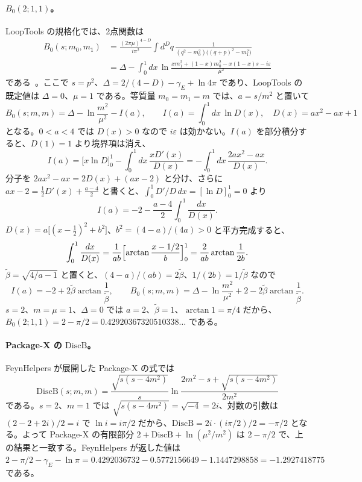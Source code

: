 \documentclass[a4paper,10pt]{ltjsarticle}
\begin{document}
\paragraph{$B_0(2;1,1)$。}LoopTools の規格化では、2点関数は
\begin{equation}
\begin{split}
B_0(s;m_0,m_1)&=\frac{(2\pi\mu)^{4-D}}{i\pi^2}\int d^Dq\,\frac{1}{(q^2-m_0^2)\bigl((q+p)^2-m_1^2\bigr)}\\
&=\Delta-\int_0^1 dx\,\ln\frac{x m_1^2+(1-x)m_0^2-x(1-x)s-i\varepsilon}{\mu^2}
\end{split}
\end{equation}
である~\cite{fcalc}。ここで $s=p^2$、$\Delta=2/(4-D)-\gamma_E+\ln4\pi$ であり、LoopTools の既定値は $\Delta=0$、$\mu=1$ である。等質量 $m_0=m_1=m$ では、$a=s/m^2$ と置いて
\begin{equation}
B_0(s;m,m)=\Delta-\ln\frac{m^2}{\mu^2}-I(a),\qquad I(a)=\int_0^1dx\,\ln D(x),\quad D(x)=ax^2-ax+1
\end{equation}
となる。$0<a<4$ では $D(x)>0$ なので $i\varepsilon$ は効かない。$I(a)$ を部分積分すると、$D(1)=1$ より境界項は消え、
\begin{equation}
I(a)=\bigl[x\ln D\bigr]_0^1-\int_0^1dx\,\frac{xD'(x)}{D(x)}=-\int_0^1dx\,\frac{2ax^2-ax}{D(x)}.
\end{equation}
分子を $2ax^2-ax=2D(x)+(ax-2)$ と分け、さらに $ax-2=\tfrac12D'(x)+\tfrac{a-4}{2}$ と書くと、$\int_0^1D'/D\,dx=[\ln D]_0^1=0$ より
\begin{equation}
I(a)=-2-\frac{a-4}{2}\int_0^1\frac{dx}{D(x)}.
\end{equation}
$D(x)=a\bigl[(x-\tfrac12)^2+b^2\bigr]$、$b^2=(4-a)/(4a)>0$ と平方完成すると、
\begin{equation}
\int_0^1\frac{dx}{D(x)}=\frac{1}{ab}\Bigl[\arctan\frac{x-1/2}{b}\Bigr]_0^1=\frac{2}{ab}\arctan\frac{1}{2b}.
\end{equation}
$\tilde\beta=\sqrt{4/a-1}$ と置くと、$(4-a)/(ab)=2\tilde\beta$、$1/(2b)=1/\tilde\beta$ なので
\begin{equation}
I(a)=-2+2\tilde\beta\arctan\frac{1}{\tilde\beta},\qquad
B_0(s;m,m)=\Delta-\ln\frac{m^2}{\mu^2}+2-2\tilde\beta\arctan\frac{1}{\tilde\beta}.
\end{equation}
$s=2$、$m=\mu=1$、$\Delta=0$ では $a=2$、$\tilde\beta=1$、$\arctan1=\pi/4$ だから、$B_0(2;1,1)=2-\pi/2=0.42920367320510338\ldots$ である。

\paragraph{Package-X の $\mathrm{DiscB}$。}FeynHelpers が展開した Package-X の式では
\begin{equation}
\mathrm{DiscB}(s;m,m)=\frac{\sqrt{s(s-4m^2)}}{s}\ln\frac{2m^2-s+\sqrt{s(s-4m^2)}}{2m^2}
\end{equation}
である。$s=2$、$m=1$ では $\sqrt{s(s-4m^2)}=\sqrt{-4}=2i$、対数の引数は $(2-2+2i)/2=i$ で $\ln i=i\pi/2$ だから、$\mathrm{DiscB}=2i\cdot(i\pi/2)/2=-\pi/2$ となる。よって Package-X の有限部分 $2+\mathrm{DiscB}+\ln(\mu^2/m^2)$ は $2-\pi/2$ で、上の結果と一致する。FeynHelpers が返した値は $2-\pi/2-\gamma_E-\ln\pi=0.4292036732-0.5772156649-1.1447298858=-1.2927418775$ である。
\end{document}
